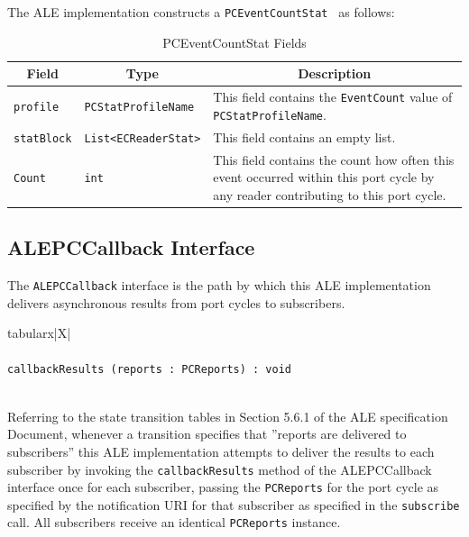 \documentclass[11pt,a4paper,oneside]{article}
\newenvironment{bbox}%
{\begin{table}[h!]\begin{threeparttable}}%
{\end{threeparttable}\end{table}\FloatBarrier}
\newenvironment{bbox}
{\ifvmode\IgnorePar\fi \EndP\Tg<div class='bbox'>}{\Tg</div>\IgnoreIndent}
\begin{document}
The ALE implementation constructs a \texttt{PCEventCountStat } as follows:

\begin{table}[!h]
\begin{tabularx}{\linewidth}{|X|l|X|}
\hline
\multicolumn{1}{|c|}{\textbf{Field}}&
\multicolumn{1}{c|}{\textbf{Type}}&
\multicolumn{1}{c|}{\textbf{Description}}\\
\hline 
\texttt{profile} &\texttt{PCStatProfileName}&This field contains the \texttt{EventCount} value of \texttt{PCStatProfileName}.\\ 
\hline 
\texttt{statBlock} &\texttt{List<ECReaderStat>}&This field contains an empty list.\\
\hline
\texttt{Count}&\texttt{int}&This field contains the count how often this event occurred within this port cycle by any reader contributing to this port cycle.\\ \hline
\end{tabularx}
\caption{PCEventCountStat Fields}
\MakeLineNo
\end{table}
\FloatBarrier 

\subsection{ALEPCCallback Interface}
\label{subsec:ALEPCCallback}
The \texttt{ALEPCCallback} interface is the path by which this ALE implementation delivers asynchronous results from port cycles to subscribers.

\begin{bbox}
\begin{edtable}{tabularx}{\linewidth}{|X|}
\hline 
{}
\\
\\
\texttt{callbackResults (reports : PCReports) : void}\\
\texttt{\textendash \textendash \textendash}\\
\hline
\end{edtable}
\end{bbox}

Referring to the state transition tables in Section 5.6.1 of the ALE specification Document, whenever a transition specifies that ''reports are delivered to subscribers'' this ALE implementation attempts to deliver the results to each subscriber by invoking the \texttt{callbackResults} method of the ALEPCCallback interface once for each subscriber, passing the \texttt{PCReports} for the port cycle as specified by the notification URI for that subscriber as specified in the \texttt{subscribe} call. All subscribers receive an identical \texttt{PCReports} instance.
\end{document}
